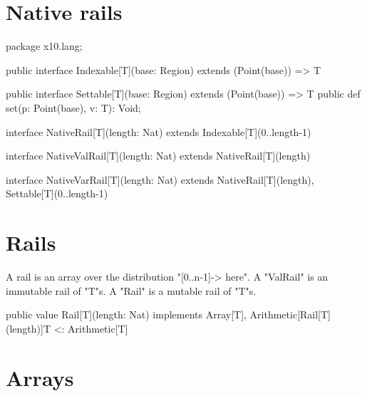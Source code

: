 \section{Native rails}

\begin{xten}
package x10.lang;

public interface Indexable[T](base: Region) extends (Point(base)) => T { } 

public interface Settable[T](base: Region) extends (Point(base)) => T {
    public def set(p: Point(base), v: T): Void;
} 

interface NativeRail[T](length: Nat) extends Indexable[T](0..length-1) { }

interface NativeValRail[T](length: Nat) extends NativeRail[T](length) { }

interface NativeVarRail[T](length: Nat) extends NativeRail[T](length),
    Settable[T](0..length-1) { }
\end{xten}

\section{Rails}


A rail is an array over the distribution \xcd"[0..n-1]-> here".
A \xcd"ValRail" is an immutable rail of \xcd"T"s.
A \xcd"Rail" is a mutable rail of \xcd"T"s.

\begin{xten}
public value Rail[T](length: Nat) 
    implements Array[T], Arithmetic[Rail[T](length)]{T <: Arithmetic[T]}
{
}
\end{xten}



\section{Arrays}


